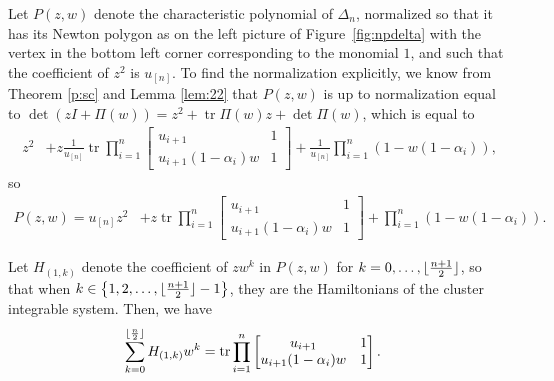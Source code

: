 \documentclass[10pt,a4paper]{amsart}
\numberwithin{equation}{section}
\DeclarePairedDelimiter\floor{\lfloor}{\rfloor}
\DeclareMathOperator{\tr}{tr}
\begin{document}
	Let $P(z,w)$ denote the characteristic polynomial of $\Delta_n$, normalized so that it has its Newton polygon as {on the left picture of} Figure~\ref{fig:npdelta} with the vertex in the bottom left corner corresponding to the monomial $1$, and such that the coefficient of $z^2$ is $u_{[n]}$. To find the normalization explicitly, we know from Theorem \ref{p:sc} and Lemma \ref{lem:22} that $P(z,w)$ is up to normalization equal to $\det (zI+\Pi(w)) = z^2+\tr \Pi(w) z + \det \Pi(w)$, which is equal to
	\begin{align*}
		z^2 &+z \frac{1}{u_{[n]}} \tr \prod_{i=1}^{ n }\begin{bmatrix}
			u_{i+1}&1\\
			u_{i+1}(1-\alpha_{i})w &1
		\end{bmatrix} + \frac{1}{u_{[n]}} \prod_{i=1}^n (1-w(1-\alpha_i)),
	\end{align*}
	so
	\begin{align*}
		P(z,w)=u_{[n]}z^2 &+z \tr \prod_{i=1}^{ n }\begin{bmatrix}
			u_{i+1}&1\\
			u_{i+1}(1-\alpha_{i})w &1
		\end{bmatrix} + \prod_{i=1}^n (1-w(1-\alpha_i)).
	\end{align*}
	
	Let $H_{(1,k)}$ denote the coefficient of $z w^k$ in $P(z,w)$ for $k=0,\dots,\floor{\frac{n+1}{2}}$, so that when ${k \in \bigl\{1,2,\dots,\floor{\frac{n+1}{2}} -1\bigr\}}$, they are the Hamiltonians of the cluster integrable system. Then, we have
	\begin{align*}
		\sum_{k=0}^{\floor{\frac n 2}} H_{(1,k)} w^k &= \tr \prod_{i=1}^{ n }\begin{bmatrix}
			u_{i+1}&1\\
			u_{i+1}(1-\alpha_{i})w &1
		\end{bmatrix}.
	\end{align*}
	
\end{document}
